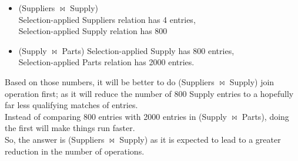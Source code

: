 \documentclass[10pt]{article}
\begin{document}
\begin{enumerate}
\begin{enumerate}[(a)]
					\begin{itemize}
						\item (Suppliers $\bowtie$ Supply)\\
						Selection-applied Suppliers relation has 4 entries,\\
						Selection-applied Supply relation has 800\\
						
						\item (Supply $\bowtie$ Parts)
						Selection-applied Supply has 800 entries,\\
						Selection-applied Parts relation has 2000 entries.\\
					\end{itemize}
					
					Based on those numbers, it will be better to do (Suppliers $\bowtie$ Supply) join operation first; as it will reduce the number of 800 Supply entries to a hopefully far less qualifying matches of entries.\\
					Instead of comparing 800 entries with 2000 entries in (Supply $\bowtie$ Parts), doing the first will make things run faster.\\
					
					So, the answer is (Suppliers $\bowtie$ Supply) as it is expected to lead to a greater reduction in the number of operations.
				\end{enumerate}
		\end{enumerate}
		
\end{document}
